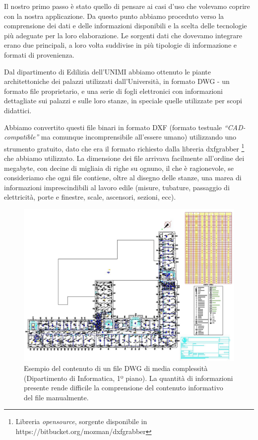 \documentclass[12pt]{report}
\begin{document}
Il nostro primo passo è stato quello di pensare ai casi d'uso che volevamo coprire con la nostra applicazione. Da questo punto abbiamo proceduto verso la comprensione dei dati e delle informazioni disponibili e la scelta delle tecnologie più adeguate per la loro elaborazione. Le sorgenti dati che dovevamo integrare erano due principali, a loro volta suddivise in più tipologie di informazione e formati di provenienza.

Dal dipartimento di Edilizia dell'UNIMI abbiamo ottenuto le piante architettoniche dei palazzi utilizzati dall'Università, in formato DWG - un formato file proprietario, e una serie di fogli elettronici con informazioni dettagliate sui palazzi e sulle loro stanze, in speciale quelle utilizzate per scopi didattici.

Abbiamo convertito questi file binari in formato DXF (formato testuale \textit{``CAD-compatible''} ma comunque incomprensibile all'essere umano) utilizzando uno strumento gratuito, dato che era il formato richiesto dalla libreria dxfgrabber \footnote{Libreria \textit{opensource}, sorgente disponibile in https://bitbucket.org/mozman/dxfgrabber} che abbiamo utilizzato. La dimensione dei file arrivava facilmente all'ordine dei megabyte, con decine di migliaia di righe su ognuno, il che è ragionevole, se consideriamo che ogni file contiene, oltre al disegno delle stanze, una marea di informazioni imprescindibili al lavoro edile (misure, tubature, passaggio di elettricità, porte e finestre, scale, ascensori, sezioni, ecc).

\begin{figure}[h]
    \centering
    \includegraphics[width=\textwidth]{03-dxf-chaos.jpg}
    \caption{Esempio del contenuto di un file DWG di media complessità (Dipartimento di Informatica, 1º piano). La quantità di informazioni presente rende difficile la comprensione del contenuto informativo del file manualmente. }
    \label{fig:dxf_chaos}
\end{figure}
\end{document}

